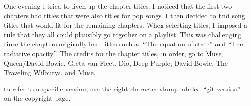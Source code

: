 One evening I tried to liven up the chapter titles. I noticed that the first two chapters had titles that were also titles for pop songs. I then decided to find song titles that would fit for the remaining chapters. When selecting titles, I imposed a rule that they all could plausibly go together on a playlist. This was challenging since the chapters originally had titles such as ``The equation of state'' and ``The radiative opacity''. The credits for the chapter titles, in order, go to Muse, Queen/David Bowie, Greta van Fleet, Dio, Deep Purple, David Bowie, The Traveling Wilburys, and Muse.

 to refer to a specific version, use the eight-character stamp labeled ``git version'' on the copyright page.
